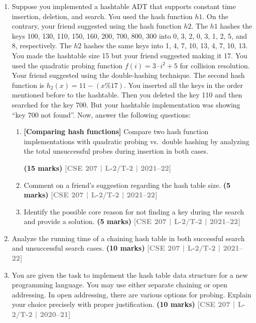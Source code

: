 \documentclass[12pt]{article}
\newcommand{\yr}[1]{\hfill\textcolor{gray}{\small\textbf{[#1]}}}
\newcommand{\mk}[1]{\textcolor{orange!70!black}{\small\textbf{(#1 marks)}}}
\begin{document}
\begin{enumerate}
\item Suppose you implemented a hashtable ADT that supports constant time insertion, deletion, and search. You used the hash function $h1$. On the contrary, your friend suggested using the hash function $h2$. The $h1$ hashes the keys 100, 130, 110, 150, 160, 200, 700, 800, 300 into 0, 3, 2, 0, 3, 1, 2, 5, and 8, respectively. The $h2$ hashes the same keys into 1, 4, 7, 10, 13, 4, 7, 10, 13. You made the hashtable size 15 but your friend suggested making it 17. You used the quadratic probing function $f(i) = 3 \cdot i^2 + 5$ for collision resolution. Your friend suggested using the double-hashing technique. The second hash function is $h_2(x) = 11 - (x \% 17)$. You inserted all the keys in the order mentioned before to the hashtable. Then you deleted the key 110 and then searched for the key 700. But your hashtable implementation was showing ``key 700 not found''. Now, answer the following questions:
\begin{enumerate}
\item \textbf{[Comparing hash functions]} Compare two hash function implementations with quadratic probing vs.\ double hashing by analyzing the total unsuccessful probes during insertion in both cases.

\mk{15} \yr{CSE 207 | L-2/T-2 | 2021--22}

\item Comment on a friend's suggestion regarding the hash table size.
\mk{5} \yr{CSE 207 | L-2/T-2 | 2021--22}

\item Identify the possible core reason for not finding a key during the search and provide a solution.
\mk{5} \yr{CSE 207 | L-2/T-2 | 2021--22}

\end{enumerate}



\item Analyze the running time of a chaining hash table in both successful search and unsuccessful search cases.
\mk{10} \yr{CSE 207 | L-2/T-2 | 2021--22}


\item You are given the task to implement the hash table data structure for a new programming language. You may use either separate chaining or open addressing. In open addressing, there are various options for probing. Explain your choice precisely with proper justification.
\mk{10} \yr{CSE 207 | L-2/T-2 | 2020--21}





\end{enumerate}
\end{document}
